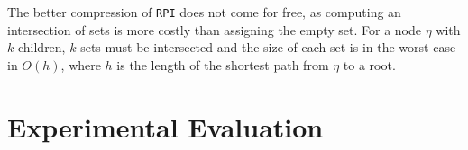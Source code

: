 \documentclass[envcountsame]{llncs}
\newcommand{\RPI}{\texttt{\upshape RPI}}
\begin{document}
The better compression of {\RPI} does not come for free, 
as computing an intersection of sets is more costly than assigning the empty set. 
For a node $\eta$ with $k$ children, $k$ sets must be intersected and the size of each set is 
in the worst case in $O(h)$, where $h$ is the length of the shortest path from $\eta$ to a root.

%
%
%
%
%
%






\section{Experimental Evaluation}
\label{sec:evaluation}
\end{document}
